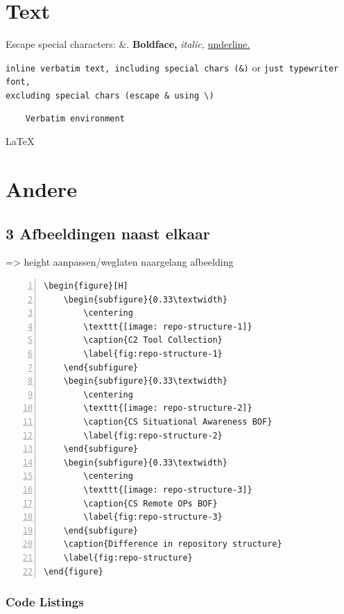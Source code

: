 \documentclass[a4paper, 11pt]{report}
\begin{document}
\section{Text}
Escape special characters: \&. \textbf{Boldface,} \textit{italic,} \underline{underline.}

\verb|inline verbatim text, including special chars (&)| or \texttt{just typewriter font, \\ excluding special chars (escape \& using \textbackslash)}

\begin{verbatim}
	Verbatim environment
\end{verbatim}

\LaTeX{}

\newpage

\section{Andere}

\subsection{3 Afbeeldingen naast elkaar}
=> height aanpassen/weglaten naargelang afbeelding
\begin{lstlisting}[frame=single,numbers=left,basicstyle=\ttfamily,caption={3 afbeeldingen},label=multi-img]
\begin{figure}[H]
	\begin{subfigure}{0.33\textwidth}
		\centering
		\texttt{[image: repo-structure-1]}
		\caption{C2 Tool Collection}
		\label{fig:repo-structure-1}
	\end{subfigure}
	\begin{subfigure}{0.33\textwidth}
		\centering
		\texttt{[image: repo-structure-2]}
		\caption{CS Situational Awareness BOF}
		\label{fig:repo-structure-2}
	\end{subfigure}
	\begin{subfigure}{0.33\textwidth}
		\centering
		\texttt{[image: repo-structure-3]}
		\caption{CS Remote OPs BOF}
		\label{fig:repo-structure-3}
	\end{subfigure}
	\caption{Difference in repository structure}
	\label{fig:repo-structure}
\end{figure}
\end{lstlisting}

\subsubsection{Code Listings}
\begin{lstlisting}[frame=single,basicstyle=\ttfamily,caption={Code from file},breaklines=true]

\end{lstlisting}
\end{document}
